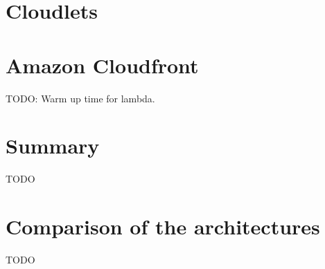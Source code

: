 \section{Cloudlets}







\section{Amazon Cloudfront}
TODO: Warm up time for lambda.
\section{Summary}
TODO

\section{Comparison of the architectures}
TODO